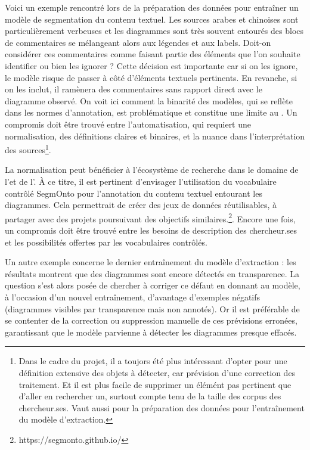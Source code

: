 Voici un exemple rencontré lors de la préparation des données pour
entraîner un modèle de segmentation du contenu textuel. Les sources
arabes et chinoises sont particulièrement verbeuses et les diagrammes
sont très souvent entourés des blocs de commentaires se mélangeant alors
aux légendes et aux labels. Doit-on considérer ces commentaires comme
faisant partie des éléments que l'on souhaite identifier ou bien les ignorer
? Cette décision est importante car si on les ignore, le modèle risque
de passer à côté d'éléments textuels pertinents. En revanche, si on les
inclut, il ramènera des commentaires sans rapport direct avec le
diagramme observé. On voit ici comment la binarité des modèles, qui se
reflète dans les normes d'annotation, est problématique et constitue une
limite au \ml. Un compromis doit être trouvé entre
l'automatisation, qui requiert une normalisation, des définitions
claires et binaires, et la nuance dans l'interprétation des
sources\footnote{Dans le cadre du projet, il a toujors été plus
  intéressant d'opter pour une définition extensive des objets à
  détecter, car prévision d'une correction des traitement. Et il est
  plus facile de supprimer un élémént pas pertinent que d'aller en
  rechercher un, surtout compte tenu de la taille des corpus des
  chercheur.ses. Vaut aussi pour la préparation des données pour
  l'entraînement du modèle d'extraction.}.

La normalisation peut bénéficier à l'écosystème de recherche dans le
domaine de l'\htr et de l'\ocr. À ce titre, il est pertinent d'envisager
l'utilisation du vocabulaire contrôlé SegmOnto pour l'annotation du
contenu textuel entourant les diagrammes. Cela permettrait de créer des
jeux de données réutilisables, à partager avec des projets poursuivant
des objectifs similaires.\footnote{https://segmonto.github.io/}. Encore
une fois, un compromis doit être trouvé entre les besoins de description
des chercheur.ses et les possibilités offertes par les vocabulaires
contrôlés.

Un autre exemple concerne le dernier entraînement du modèle d'extraction
: les résultats montrent que des diagrammes sont encore détectés en
transparence. La question s'est alors posée de chercher à corriger ce
défaut en donnant au modèle, à l'occasion d'un nouvel entraînement,
d'avantage d'exemples négatifs (diagrammes visibles par transparence
mais non annotés). Or il est préférable de se contenter de la correction
ou suppression manuelle de ces prévisions erronées, garantissant que le
modèle parvienne à détecter les diagrammes presque effacés.

